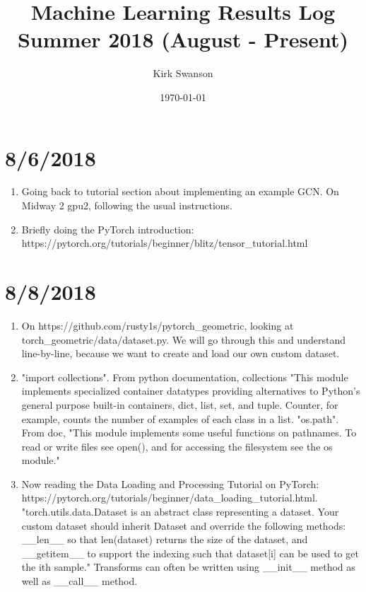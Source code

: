 \documentclass[12pt,reqno]{amsart}
\numberwithin{equation}{section}
\begin{document}
\title{Machine Learning Results Log Summer 2018 (August - Present)}
\author{Kirk Swanson}
\address{Institute for Molecular Engineering, University of Chicago, 5640 S Ellis Ave, Chicago, IL 60637}
\date{\today}

\maketitle

\section{8/6/2018}
\begin{enumerate}
\item Going back to tutorial section about implementing an example GCN.  On Midway 2 gpu2, following the usual instructions.  
\item Briefly doing the PyTorch introduction: https://pytorch.org/tutorials/beginner/blitz/tensor\_tutorial.html
\end{enumerate}

\section{8/8/2018}
\begin{enumerate}
\item On https://github.com/rusty1s/pytorch\_geometric, looking at torch\_geometric/data/dataset.py.  We will go through this and understand line-by-line, because we want to create and load our own custom dataset.
\item "import collections".  From python documentation, collections "This module implements specialized container datatypes providing alternatives to Python's general purpose built-in containers, dict, list, set, and tuple.  Counter, for example, counts the number of examples of each class in a list.  "os.path".  From doc, "This module implements some useful functions on pathnames.  To read or write files see open(), and for accessing the filesystem see the os module."  
\item Now reading the Data Loading and Processing Tutorial on PyTorch: https://pytorch.org/tutorials/beginner/data\_loading\_tutorial.html.  "torch.utils.data.Dataset is an abstract class representing a dataset.  Your custom dataset should inherit Dataset and override the following methods: \_\_len\_\_ so that len(dataset) returns the size of the dataset, and \_\_getitem\_\_ to support the indexing such that dataset[i] can be used to get the ith sample."  Transforms can often be written using \_\_init\_\_ method as well as \_\_call\_\_ method.  
\end{enumerate}
\end{document}
